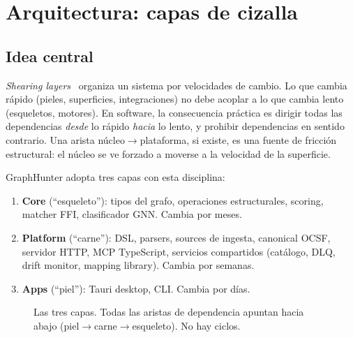 \chapter{Arquitectura: capas de cizalla}
\label{sec:paper-arq}

\section{Idea central}

\emph{Shearing
layers}~\cite{brand1994how} organiza un sistema por velocidades de
cambio. Lo que cambia rápido (pieles, superficies, integraciones)
no debe acoplar a lo que cambia lento (esqueletos, motores). En
software, la consecuencia práctica es dirigir todas las
dependencias \emph{desde} lo rápido \emph{hacia} lo lento, y
prohibir dependencias en sentido contrario. Una arista
núcleo$\to$plataforma, si existe, es una fuente de fricción
estructural: el núcleo se ve forzado a moverse a la velocidad de
la superficie.

GraphHunter adopta tres capas con esta disciplina:

\begin{enumerate}
    \item \textbf{Core} (``esqueleto''): tipos del grafo, operaciones
    estructurales, scoring, matcher FFI, clasificador GNN. Cambia
    por meses.
    \item \textbf{Platform} (``carne''): DSL, parsers, sources de
    ingesta, canonical OCSF, servidor HTTP, MCP TypeScript,
    servicios compartidos (catálogo, DLQ, drift monitor, mapping
    library). Cambia por semanas.
    \item \textbf{Apps} (``piel''): Tauri desktop, CLI. Cambia por
    días.
\end{enumerate}

\begin{figure}[H]
\centering
{}
\caption{Las tres capas. Todas las aristas de dependencia apuntan
hacia abajo (piel$\to$carne$\to$esqueleto). No hay ciclos.}
\label{fig:paper-capas}
\end{figure}

